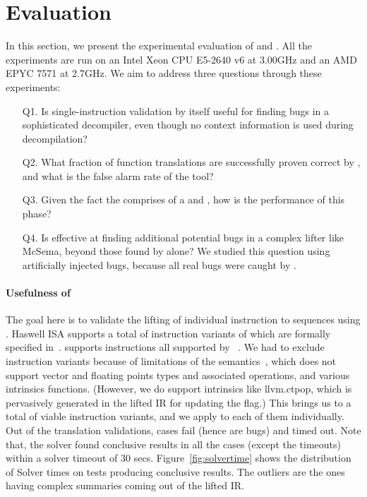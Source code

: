 \section{Evaluation} \label{sec:eval}
In this section, we present the experimental evaluation of 
\siv and \plv. All the experiments are run on an Intel Xeon CPU E5-2640 v6 at 3.00GHz
and an AMD  EPYC 7571 at 2.7GHz.  We aim to address three questions through these
experiments:
%
\begin{itemize}
  \item[Q1.] Is single-instruction validation by itself useful for finding bugs in
  a sophisticated decompiler, even though no context information is used during 
  decompilation?
  \item[Q2.] What fraction of function translations are successfully proven correct
  by \plv, and what is the false alarm rate of the tool?
  \item[Q3.] Given the fact the \plv  comprises of a \compd and \matcher, how is
  the performance of this phase?
  \item[Q4.] Is \plv effective at finding additional potential bugs in a complex 
  lifter like McSema, beyond those found by \siv alone?  We studied this question
  using artificially injected bugs, because all real bugs were caught by \siv.
\end{itemize}

\paragraph{Usefulness of \siv}
The goal here is to validate the lifting of individual \ISA instruction to 
\LLVM sequences using \mcsema. 
Haswell \ISA ISA supports a total of \totalIS instruction variants of which 
\currentIS are formally specified in~\cite{DasguptaAdve:PLDI19}. \mcsema 
supports \mcsemaIS instructions all supported by ~\cite{DasguptaAdve:PLDI19}.
We had to exclude \sivExc instruction variants because of limitations 
of the \LLVM semantics~\cite{LLVMSEMA}, which does not support vector and floating 
points types and associated operations, and various intrinsics 
functions. (However, we do support intrinsics like llvm.ctpop, which is 
pervasively generated in the lifted IR for updating the  flag.) This 
brings us to a total of \sivIS viable instruction variants, and we apply
\TV to each of them individually.
%
Out of the \sivIS translation validations, \sivFail cases fail (hence are bugs) and 
\sivTO timed out. Note that, the solver found conclusive results in all the cases 
(except the timeouts) within a solver timeout of 30 secs. Figure~\ref{fig:solvertime}
shows the distribution of Solver times on tests producing conclusive results. The outliers are
the ones having complex summaries coming out of the lifted IR.


